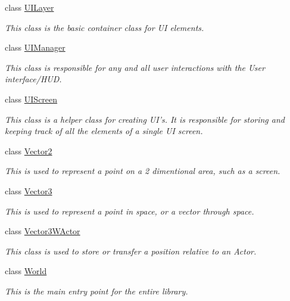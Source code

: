\begin{DoxyCompactItemize}
class \hyperlink{classphys_1_1UILayer}{UILayer}
\begin{DoxyCompactList}\small\item\em This class is the basic container class for UI elements. \item\end{DoxyCompactList}\item 
class \hyperlink{classphys_1_1UIManager}{UIManager}
\begin{DoxyCompactList}\small\item\em This class is responsible for any and all user interactions with the User interface/HUD. \item\end{DoxyCompactList}\item 
class \hyperlink{classphys_1_1UIScreen}{UIScreen}
\begin{DoxyCompactList}\small\item\em This class is a helper class for creating UI's. It is responsible for storing and keeping track of all the elements of a single UI screen. \item\end{DoxyCompactList}\item 
class \hyperlink{classphys_1_1Vector2}{Vector2}
\begin{DoxyCompactList}\small\item\em This is used to represent a point on a 2 dimentional area, such as a screen. \item\end{DoxyCompactList}\item 
class \hyperlink{classphys_1_1Vector3}{Vector3}
\begin{DoxyCompactList}\small\item\em This is used to represent a point in space, or a vector through space. \item\end{DoxyCompactList}\item 
class \hyperlink{classphys_1_1Vector3WActor}{Vector3WActor}
\begin{DoxyCompactList}\small\item\em This class is used to store or transfer a position relative to an Actor. \item\end{DoxyCompactList}\item 
class \hyperlink{classphys_1_1World}{World}
\begin{DoxyCompactList}\small\item\em This is the main entry point for the entire library. \item\end{DoxyCompactList}\item 

\end{DoxyCompactItemize}
